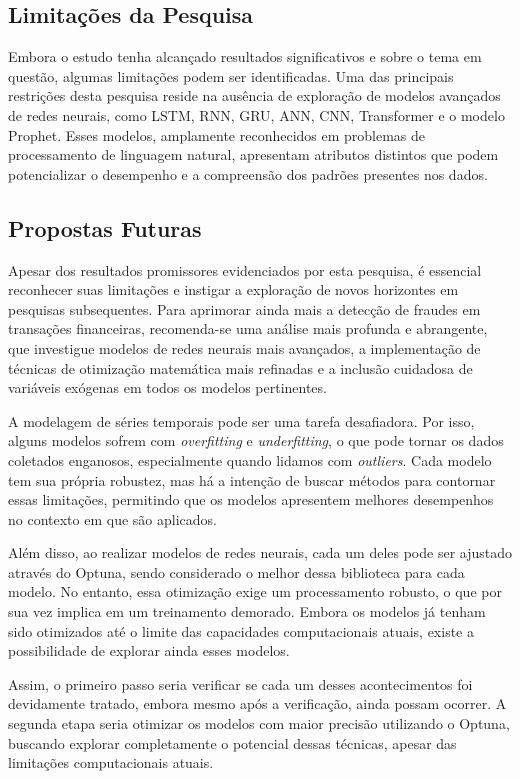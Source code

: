 \subsection{Limita\c c\~oes da Pesquisa}


Embora o estudo tenha alcançado resultados significativos e sobre o tema em questão, algumas limitações podem ser identificadas. Uma das principais restrições desta pesquisa reside na ausência de exploração de modelos avançados de redes neurais, como LSTM, RNN, GRU, ANN, CNN, Transformer e o modelo Prophet. Esses modelos, amplamente reconhecidos em problemas de processamento de linguagem natural, apresentam atributos distintos que podem potencializar o desempenho e a compreensão dos padrões presentes nos dados.



\subsection{Propostas Futuras}

Apesar dos resultados promissores evidenciados por esta pesquisa, é essencial reconhecer suas limitações e instigar a exploração de novos horizontes em pesquisas subsequentes. Para aprimorar ainda mais a detecção de fraudes em transações financeiras, recomenda-se uma análise mais profunda e abrangente, que investigue modelos de redes neurais mais avançados, a implementação de técnicas de otimização matemática mais refinadas e a inclusão cuidadosa de variáveis exógenas em todos os modelos pertinentes.

A modelagem de séries temporais pode ser uma tarefa desafiadora. Por isso, alguns modelos sofrem com \textit{overfitting} e \textit{underfitting}, o que pode tornar os dados coletados enganosos, especialmente quando lidamos com \textit{outliers}. Cada modelo tem sua própria robustez, mas há a intenção de buscar métodos para contornar essas limitações, permitindo que os modelos apresentem melhores desempenhos no contexto em que são aplicados.

Além disso, ao realizar modelos de redes neurais, cada um deles pode ser ajustado através do Optuna, sendo considerado o melhor dessa biblioteca para cada modelo. No entanto, essa otimização exige um processamento robusto, o que por sua vez implica em um treinamento demorado. Embora os modelos já tenham sido otimizados até o limite das capacidades computacionais atuais, existe a possibilidade de explorar ainda esses modelos.

Assim, o primeiro passo seria verificar se cada um desses acontecimentos foi devidamente tratado, embora mesmo após a verificação, ainda possam ocorrer. A segunda etapa seria otimizar os modelos com maior precisão utilizando o Optuna, buscando explorar completamente o potencial dessas técnicas, apesar das limitações computacionais atuais.

